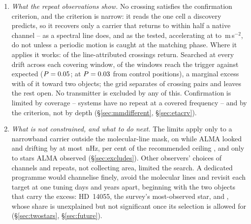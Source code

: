 \begin{enumerate}[leftmargin=1.6em,itemsep=4pt,topsep=4pt,parsep=0pt]
\item \emph{What the repeat observations show.} No crossing satisfies the
confirmation criterion, and the criterion is narrow: it reads the one cell a
discovery predicts, so it recovers only a carrier that returns to within half
a native channel -- as a spectral line does, and as the \RcNExcl{} tested,
accelerating at \ZtALosLo{} to \ZtALosHi\,m\,s$^{-2}$, do not unless a
periodic motion is caught at the matching phase. Where it applies it works:
\MkAttrRecur{} of the \MkAttrTested{} line-attributed crossings return.
Searched at every drift across each covering window, \WuNWinExc{} of the
\WuNWin{} windows reach the trigger against \WuExpWin{} expected
($P=0.05$; \WuExpWinCtrl{} at $P=0.03$ from control
positions), a marginal excess with \WuNWinExcTwo{} of it toward two objects;
the grid separates \TjNExcl{} of \TjNPair{} crossing pairs and leaves the rest
open. No transmitter is excluded by any of this. Confirmation is limited by
coverage -- \ZcNoRepSys{} systems have no repeat at a covered frequency -- and
by the criterion, not by depth (\S\ref{sec:mmdifferent}, \S\ref{sec:etacrv}).

\item \emph{What is not constrained, and what to do next.} The limits apply
only to a narrowband carrier outside the molecular-line mask, on while ALMA
looked and drifting by at most \DriftCeilLo\,nHz, \AccelSheikhPct{} per cent
of the recommended ceiling \citep{Sheikh2019}, and only to stars ALMA observed
(\S\ref{sec:excludes}). Other observers' choices of channels and repeats, not
collecting area, limited the search. A dedicated programme would channelise
finely, avoid the molecular lines and revisit each target at one tuning days
and years apart, beginning with the two objects that carry the excess:
HD~14055, the survey's most-observed star, and \BkAlmaName, whose share is
unexplained but not significant once its selection is allowed for (\S\ref{sec:twostars}, \S\ref{sec:future}).

\end{enumerate}

